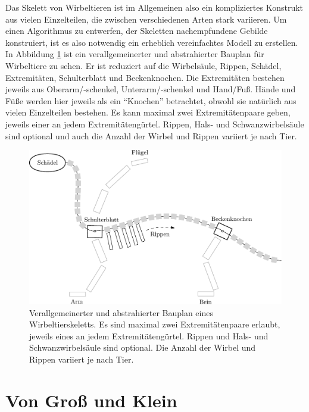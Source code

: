 Das Skelett von Wirbeltieren ist im Allgemeinen also ein kompliziertes Konstrukt aus vielen Einzelteilen, die zwischen verschiedenen Arten stark variieren. Um einen Algorithmus zu entwerfen, der Skeletten nachempfundene Gebilde konstruiert, ist es also notwendig ein erheblich vereinfachtes Modell zu erstellen.\\ 
In Abbildung \ref{bauplan_skelett} ist ein verallgemeinerter und abstrahierter Bauplan für Wirbeltiere zu sehen. Er ist reduziert auf die Wirbelsäule, Rippen, Schädel, Extremitäten, Schulterblatt und Beckenknochen. Die Extremitäten bestehen jeweils aus Oberarm/-schenkel, Unterarm/-schenkel und Hand/Fuß. Hände und Füße werden hier jeweils als ein "`Knochen"' betrachtet, obwohl sie natürlich aus vielen Einzelteilen bestehen. Es kann maximal zwei Extremitätenpaare geben, jeweils einer an jedem Extremitätengürtel. Rippen, Hals- und Schwanzwirbelsäule sind optional und auch die Anzahl der Wirbel und Rippen variiert je nach Tier.

\begin{figure}
 \centering
 \includegraphics[width=\textwidth]{graphics/skeletonPlan}
 \caption{Verallgemeinerter und abstrahierter Bauplan eines Wirbeltierskeletts. Es sind maximal zwei Extremitätenpaare erlaubt, jeweils eines an jedem Extremitätengürtel. Rippen und Hals- und Schwanzwirbelsäule sind optional. Die Anzahl der Wirbel und Rippen variiert je nach Tier.}
 \label{bauplan_skelett}
\end{figure}


\section{Von Groß und Klein}
\label{bigAndSmall}


